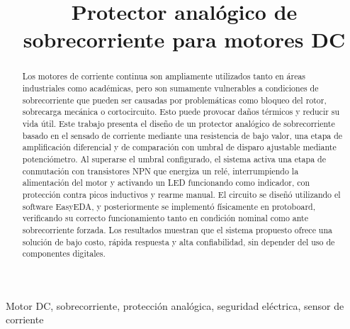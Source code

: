 \documentclass[conference]{IEEEtran}
\begin{document}
\title{Protector analógico de sobrecorriente para motores DC\\}
\author{
    \and
}

\maketitle

\begin{abstract}
Los motores de corriente continua son ampliamente utilizados tanto en áreas industriales como académicas, pero son sumamente vulnerables a condiciones de sobrecorriente que pueden ser causadas por problemáticas como bloqueo del rotor, sobrecarga mecánica o cortocircuito. Esto puede provocar daños térmicos y reducir su vida útil. 
Este trabajo presenta el diseño de un protector analógico de sobrecorriente basado en el sensado de corriente mediante una resistencia de bajo valor, una etapa de amplificación diferencial y de comparación con umbral de disparo ajustable mediante potenciómetro. 
Al superarse el umbral configurado, el sistema activa una etapa de conmutación con transistores NPN que energiza un relé, interrumpiendo la alimentación del motor y activando un LED funcionando como indicador, con protección contra picos inductivos y rearme manual. 
El circuito se diseñó utilizando el software EasyEDA, y posteriormente se implementó físicamente en protoboard, verificando su correcto funcionamiento tanto en condición nominal como ante sobrecorriente forzada. Los resultados muestran que el sistema propuesto ofrece una solución de bajo costo, rápida respuesta y alta confiabilidad, sin depender del uso de componentes digitales.\\
\end{abstract}

\begin{IEEEkeywords}
Motor DC, sobrecorriente, protección analógica, seguridad eléctrica, sensor de corriente
\end{IEEEkeywords}
\end{document}
